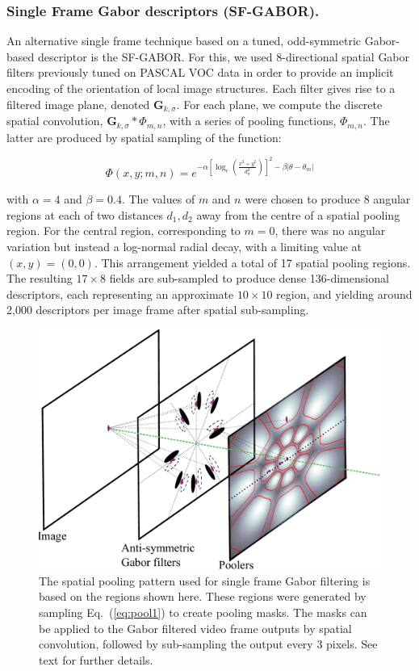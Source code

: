 \subsubsection{Single Frame Gabor descriptors (SF-GABOR).}

An alternative single frame technique based on a tuned, odd-symmetric Gabor-based descriptor is the SF-GABOR. For this, we used $8$-directional spatial Gabor filters previously tuned on PASCAL VOC data \cite{Everingham2009} in order to provide an implicit encoding of the orientation of local image structures.  Each filter gives rise to a filtered image plane, denoted $\mathbf{G}_{k,\sigma}$.  For each plane, we compute the discrete spatial convolution, $\mathbf{G}_{k,\sigma} \ast {\Phi}_{m,n}$, with a series of pooling functions, ${\Phi}_{m,n}$. The latter are produced by spatial sampling of the function:

\begin{equation}
\Phi(x,y;m,n) = e^{-\alpha \left [\log_e \left ( \frac{x^2+y^2}{d_n^2}\right ) \right ]^2 - \beta |\theta-\theta_m | }
\label{eq:pool1}
\end{equation}

\noindent with $\alpha = 4$ and $\beta = 0.4$. The values of $m$ and $n$ were chosen to produce 8 angular regions at each of two distances $d_1, d_2$ away from the centre of a spatial pooling region.  For the central region, corresponding to $m=0$, there was no angular variation but instead a log-normal radial decay, with a limiting value at $(x,y)=(0,0)$. This arrangement yielded a total of  17 spatial pooling regions. The resulting $17 \times 8$ fields are sub-sampled to produce dense 136-dimensional descriptors, each representing an approximate $10 \times 10$ region, and yielding around 2,000 descriptors per image frame after spatial sub-sampling. 

\begin{figure}[t]
\centering
\includegraphics[width=0.7\linewidth]{./gfx/Chapter04/Layers.pdf}
\caption{The spatial pooling pattern used for single frame Gabor filtering is based on the regions shown here.  These regions were generated by sampling Eq.~(\ref{eq:pool1}) to create pooling masks. The masks can be applied to the Gabor filtered video frame outputs by spatial convolution, followed by sub-sampling the output every 3 pixels. See text for further details.}
\label{fig:IsoPool}
\end{figure}

